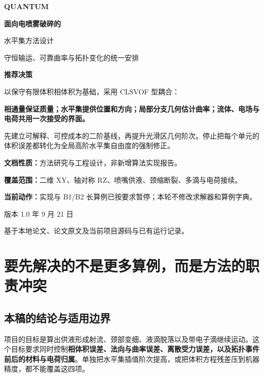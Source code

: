 \documentclass[11pt,a4paper]{article}
\begin{document}
\begin{titlepage}
\thispagestyle{empty}
\vspace*{17mm}
{\sffamily\Huge\bfseries\color{ink} QUANTUM\par}
\vspace{10mm}
{\LARGE\bfseries 面向电喷雾破碎的\par 水平集方法设计\par}
\vspace{7mm}
{\large 守恒输运、可靠曲率与拓扑变化的统一安排\par}
\vspace{13mm}
\noindent\colorbox{pale}{\parbox{150mm}{\vspace{3mm}
\textbf{推荐决策}\par
以保守有限体积相体积为基础，采用 CLSVOF 型耦合：\par
\textbf{相通量保证质量；水平集提供位置和方向；局部分支几何估计曲率；流体、电场与电荷共用一次接受的界面。}\par
\vspace{2mm}
先建立可解释、可控成本的二阶基线，再提升光滑区几何阶次。停止把每个单元的体积误差都转化为全局高阶水平集自由度的强制修正。
\vspace{3mm}}}
\vfill
\noindent\textbf{文档性质：}方法研究与工程设计，非新增算法实现报告。\par
\noindent\textbf{覆盖范围：}二维 XY、轴对称 RZ、喷嘴供液、颈缩断裂、多滴与电荷接续。\par
\noindent\textbf{当前动作：}实现与 B1/B2 长算例已按要求暂停；本轮不修改求解器和算例字典。\par
\vspace{6mm}
\noindent 版本 1.0 年 9 月 21 日\par
\noindent 基于本地论文、论文原文及当前项目源码与已有运行记录。
\end{titlepage}
\tableofcontents
\clearpage

\section{要先解决的不是更多算例，而是方法的职责冲突}
\subsection{本稿的结论与适用边界}
项目的目标是算出供液形成射流、颈部变细、液滴脱落以及带电子滴继续运动。这个目标要求同时控制\textbf{相体积误差、法向与曲率误差、离散受力误差，以及拓扑事件前后的材料与电荷归属}。单独把水平集插值阶次提高，或把体积方程残差压到机器精度，都不能覆盖这四项。
\end{document}
